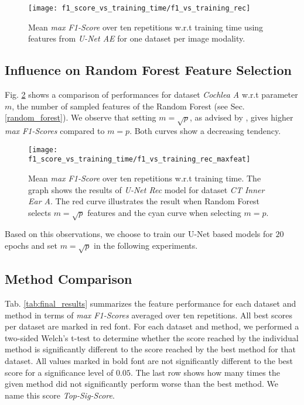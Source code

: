 \begin{figure}[!htbp]
  \centering
  {
    \texttt{[image: f1\_score\_vs\_training\_time/f1\_vs\_training\_rec]}
  }
  \caption[Feature quality vs training time of U-Net Rec model]{Mean \textit{max F1-Score} over ten repetitions w.r.t training time using features from \textit{U-Net AE} for one dataset per image modality.}
  \label{fig:perf_vs_training}
\end{figure}

\clearpage
\subsection{Influence on Random Forest Feature Selection} \label{sec:infl_feat_selection}
Fig. \ref{fig:perf_vs_training_maxfeat} shows a comparison of performances for dataset \textit{Cochlea A} w.r.t parameter $m$, the number of sampled features of the Random Forest (see Sec. \ref{random_forest}).
We observe that setting $m=\sqrt{p}$, as advised by \cite[Ch. 15]{hastie09}, gives higher \textit{max F1-Scores} compared to $m=p$.
Both curves show a decreasing tendency.
\vspace{10pt}

\begin{figure}[!htbp]
  \centering
  {
    \texttt{[image: f1\_score\_vs\_training\_time/f1\_vs\_training\_rec\_maxfeat]}
  }
  \caption[Feature quality vs training time of U-Net Rec model]{Mean \textit{max F1-Score} over ten repetitions w.r.t training time. The graph shows the results of \textit{U-Net Rec} model for dataset \textit{CT Inner Ear A}. The red curve illustrates the result when Random Forest selects $m=\sqrt{p}$ features and the cyan curve when selecting $m=p$.}
  \label{fig:perf_vs_training_maxfeat}
\end{figure}

Based on this observations, we choose to train our U-Net based models for $20$ epochs and set $m=\sqrt{p}$ in the following experiments.
\vspace{20pt}

\subsection{Method Comparison}
Tab. \ref{tab:final_results} summarizes the feature performance for each dataset and method in terms of \textit{max F1-Scores} averaged over ten repetitions.
All best scores per dataset are marked in red font.
For each dataset and method, we performed a two-sided Welch's t-test \cite{welch1947} to determine whether the score reached by the individual method is significantly different to the score reached by the best method for that dataset.
All values marked in bold font are not significantly different to the best score for a significance level of $0.05$.
The last row shows how many times the given method did not significantly perform worse than the best method.
We name this score \textit{Top-Sig-Score}.

